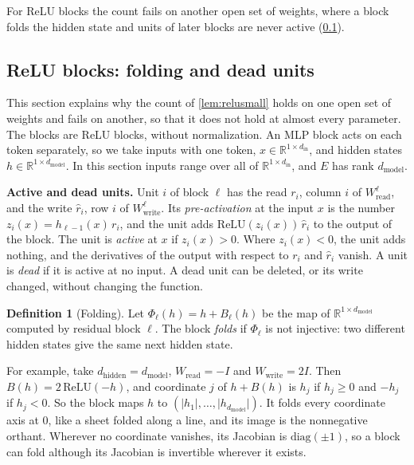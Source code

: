 \documentclass[10pt]{article}
\theoremstyle{definition}
\newtheorem{definition}[theorem]{Definition}
\theoremstyle{remark}
\newcommand{\R}{\mathbb{R}}
\newcommand{\Wread}{W_{\mathrm{read}}}
\newcommand{\Wwrite}{W_{\mathrm{write}}}
\newcommand{\dm}{d_{\mathrm{model}}}
\newcommand{\dhid}{d_{\mathrm{hidden}}}
\newcommand{\para}[1]{\smallskip\noindent\textbf{#1}\hspace{0.5em}}
\begin{document}
For ReLU blocks the count fails on another open set of weights, where a block folds the hidden state and units of later blocks are never active (\cref{app:folding}).

\subsection{ReLU blocks: folding and dead units}\label{app:folding}

This section explains why the count of \cref{lem:relusmall} holds on one open set of weights and fails on another, so that it does not hold at almost every parameter. The blocks are ReLU blocks, without normalization. An MLP block acts on each token separately, so we take inputs with one token, $x \in \R^{1\times d_{\mathrm{in}}}$, and hidden states $h \in \R^{1\times\dm}$. In this section inputs range over all of $\R^{1\times d_{\mathrm{in}}}$, and $E$ has rank $\dm$.

\para{Active and dead units.} Unit $i$ of block $\ell$ has the read $r_i$, column $i$ of $\Wread^{\ell}$, and the write $\hat r_i$, row $i$ of $\Wwrite^{\ell}$. Its \emph{pre-activation} at the input $x$ is the number $z_i(x) = h_{\ell-1}(x)\,r_i$, and the unit adds $\mathrm{ReLU}(z_i(x))\,\hat r_i$ to the output of the block. The unit is \emph{active} at $x$ if $z_i(x) > 0$. Where $z_i(x) < 0$, the unit adds nothing, and the derivatives of the output with respect to $r_i$ and $\hat r_i$ vanish. A unit is \emph{dead} if it is active at no input. A dead unit can be deleted, or its write changed, without changing the function.

\begin{definition}[Folding]
Let $\Phi_\ell(h) = h + B_\ell(h)$ be the map of $\R^{1\times\dm}$ computed by residual block $\ell$. The block \emph{folds} if $\Phi_\ell$ is not injective: two different hidden states give the same next hidden state.
\end{definition}

For example, take $\dhid = \dm$, $\Wread = -I$ and $\Wwrite = 2I$. Then $B(h) = 2\,\mathrm{ReLU}(-h)$, and coordinate $j$ of $h + B(h)$ is $h_j$ if $h_j \ge 0$ and $-h_j$ if $h_j < 0$. So the block maps $h$ to $(\lvert h_1\rvert, \dots, \lvert h_{\dm}\rvert)$. It folds every coordinate axis at $0$, like a sheet folded along a line, and its image is the nonnegative orthant. Wherever no coordinate vanishes, its Jacobian is $\mathrm{diag}(\pm 1)$, so a block can fold although its Jacobian is invertible wherever it exists.
\end{document}

